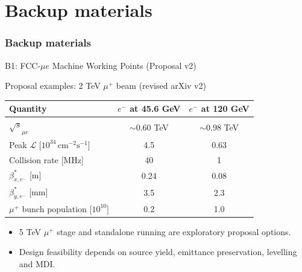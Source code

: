 \documentclass[aspectratio=1610,english]{beamer}
\newcommand{\src}[1]{\vfill{\par\color{black!65}\fontsize{6.4}{7.4}\selectfont\emph{Source:} #1\par}}
\begin{document}








\appendix

\part{Backup materials}
\section{Backup materials}




\begin{frame}[t]{B1: FCC-$\mu e$ Machine Working Points (Proposal v2)}
\small

\begin{block}{Proposal examples: 2 TeV $\mu^+$ beam (revised arXiv v2)}
\begin{center}\setlength{\tabcolsep}{6pt}
\begin{tabular}{lcc}\toprule
Quantity & $e^-$ at 45.6 GeV & $e^-$ at 120 GeV\\\midrule
$\sqrt{s}_{\mu e}$ & $\sim0.60$ TeV & $\sim0.98$ TeV\\
Peak $\mathcal L$ [$10^{34}\,\mathrm{cm}^{-2}\mathrm{s}^{-1}$] & 4.5 & 0.63\\
Collision rate [MHz] & 40 & 1\\
$\beta^*_{x,e^-}$ [m] & 0.24 & 0.08\\
$\beta^*_{y,e^-}$ [mm] & 3.5 & 2.3\\
$\mu^+$ bunch population [$10^{10}$] & 0.2 & 1.0\\\bottomrule
\end{tabular}\end{center}
\end{block}
\begin{itemize}
\justifying 
\item 5 TeV $\mu^+$ stage and standalone running are exploratory proposal options.
\item Design feasibility depends on source yield, emittance preservation, levelling and MDI.
\end{itemize}

\end{frame}
\end{document}
